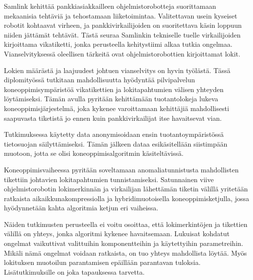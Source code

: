 \documentclass[english, 12pt, a4paper, elec, utf8, a-1b, online]{aaltothesis}
\begin{document}
\newpage
\begin{abstractpage}[finnish]
  Samlink kehittää pankkiasiakkailleen ohjelmistorobotteja
  suorittamaan mekaanisia tehtäviä ja tehostamaan liiketoimintaa.
  Valitettavan usein kyseiset robotit kohtaavat virheen,
  ja pankkivirkailijoiden on suoritettava käsin loppuun
  niiden jättämät tehtävät.
  Tästä seuraa Samlinkin tekniselle tuelle virkailijoiden kirjoittama vikatiketti,
  jonka perusteella kehitystiimi alkaa tutkia ongelmaa.
  Vianselvityksessä oleellisen tärkeitä ovat ohjelmistorobottien kirjoittamat lokit.

  Lokien määrästä ja laajuudest johtuen
  vianselvitys on hyvin työlästä.
  Tässä diplomityössä tutkitaan mahdollisuutta
  hyödyntää pilvipalvelun koneoppimisympäristöä
  vikatikettien ja lokitapahtumien välisen yhteyden löytämiseksi.
  Tämän avulla pyritään kehittämään tuotantolokeja lukeva koneoppimisjärjestelmä,
  joka kykenee varoittamaan kehittäjiä mahdollisesti saapuvasta tiketistä
  jo ennen kuin pankkivirkailijat itse havaitsevat vian.

  Tutkimuksessa käytetty data anonymisoidaan ensin tuotantoympäristössä
  tietosuojan säilyttämiseksi.
  Tämän jälkeen dataa esikäsitellään siistimpään muotoon,
  jotta se olisi koneoppimisalgoritmin käsiteltävissä.

  Koneoppimisvaiheessa pyritään soveltamaan anomaliatunnistusta
  mahdollisten tikettiin johtavien lokitapahtumien tunnistamiseksi.
  Satunnainen viive ohjelmistorobotin lokimerkinnän ja virkailijan lähettämän tiketin välillä
  yritetään ratkaista aikaikkunakompressiolla ja hybridimuotoisella koneoppimisketjulla,
  jossa hyödynnetään kahta algoritmia ketjun eri vaiheissa.

  Näiden tutkimusten perusteella ei voitu osoittaa,
  että lokimerkintöjen ja tikettien välillä on yhteys,
  jonka algoritmi kykenee havaitsemaan.
  Lukuisat kohdatut ongelmat vaikuttivat valittuihin komponentteihin
  ja käytettyihin parametreihin.
  Mikäli nämä ongelmat voidaan ratkaista,
  on tuo yhteys mahdollista löytää.
  Myös lokituksen muotoilun parantamisen epäillään parantavan tuloksia.
  Lisätutkimuksille on joka tapauksessa tarvetta.
\end{abstractpage}
\end{document}
